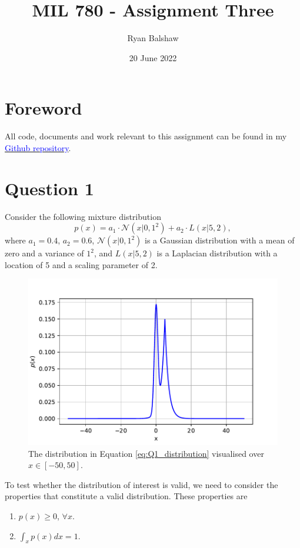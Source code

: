 \documentclass{article}
\title{MIL 780 - Assignment Three}
\author{Ryan Balshaw}
\date{20 June 2022}
\begin{document}
	
	\maketitle
	
	\section*{Foreword}
	All code, documents and work relevant to this assignment can be found in my \href{https://github.com/RyanBalshaw/MIL_780_assignments}{\textcolor{blue}{Github repository}}.
	
	\section{Question 1}
	
	Consider the following mixture distribution
	\begin{equation}\label{eq:Q1_distribution}
		p(x) = a_1 \cdot \mathcal{N}(x \vert 0, 1^2) + a_2 \cdot L(x \vert 5, 2),
	\end{equation}
	where $a_1 = 0.4$, $a_2 = 0.6$, $\mathcal{N}(x \vert 0, 1^2)$ is a Gaussian distribution with a mean of zero and a variance of $1^2$, and $L(x \vert 5, 2)$ is a Laplacian distribution with a location of 5 and a scaling parameter of 2. 
	\begin{figure}[htb!]
		\centering
		\includegraphics[scale=0.6]{Q1a.pdf}
		\caption{The distribution in Equation \eqref{eq:Q1_distribution} visualised over $x \in [-50, 50]$.}
		\label{fig:Q1_distribution}
	\end{figure}
	
	To test whether the distribution of interest is valid, we need to consider the properties that constitute a valid distribution. These properties are 
	\begin{enumerate}
		\item $p(x) \geq 0$, $\forall x$.
		\item $\int_{x} p(x) dx = 1$.
	\end{enumerate}
\end{document}
